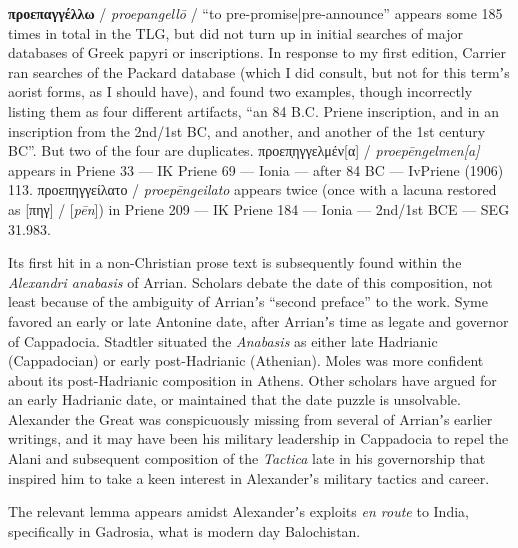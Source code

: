 \noindent{}\textbf{προεπαγγέλλω} / \textit{proepangellō} / “to pre-promise|pre-announce” %
appears some 185 times in total in the TLG, %
but did not turn up in initial searches of major databases of Greek papyri or inscriptions. %
In response to my first edition, %
Carrier ran searches of the Packard database (which I did consult, %
but not for this termʼs aorist forms, as I should have), %
and found two examples, though incorrectly listing them as four different artifacts, %
“an 84 B.C. Priene inscription, and in an inscription from the 2nd/1st BC, %
and another, and another of the 1st century BC”. %
But two of the four are duplicates. %
προεπ̣ηγγελμέν[α] / \textit{proepēngelmen[a]} appears in Priene 33 %
— IK Priene 69 — Ionia — after 84 BC — IvPriene (1906) 113. %
προεπηγγείλατο / \textit{proepēngeilato} appears twice %
(once with a lacuna restored as [πηγ] / [\textit{pēn}]) %
in Priene 209 — IK Priene 184 — Ionia — 2nd/1st BCE — SEG 31.983. %

Its first hit in a non-Christian prose text is subsequently found within the \textit{Alexandri anabasis} of Arrian. %
Scholars debate the date of this composition, %
not least because of the ambiguity of Arrianʼs “second preface” to the work. %
Syme favored an early or late Antonine date, after Arrianʼs time as %
legate and governor of Cappadocia. %
Stadtler situated the \textit{Anabasis} as either late Hadrianic (Cappadocian) or early post-Hadrianic (Athenian). %
Moles was more confident about its post-Hadrianic composition in Athens. 
Other scholars have argued for an early Hadrianic date, %
or maintained that the date puzzle is unsolvable. %
Alexander the Great was conspicuously missing from several of Arrianʼs earlier writings, %
and it may have been his military leadership in Cappadocia to repel the Alani and subsequent composition of the \textit{Tactica} late %
in his governorship that inspired him to take a keen interest in Alexanderʼs military tactics and career. %

The relevant lemma appears amidst Alexanderʼs exploits \textit{en route} to India, %
specifically in Gadrosia, %
what is modern day Balochistan. %

